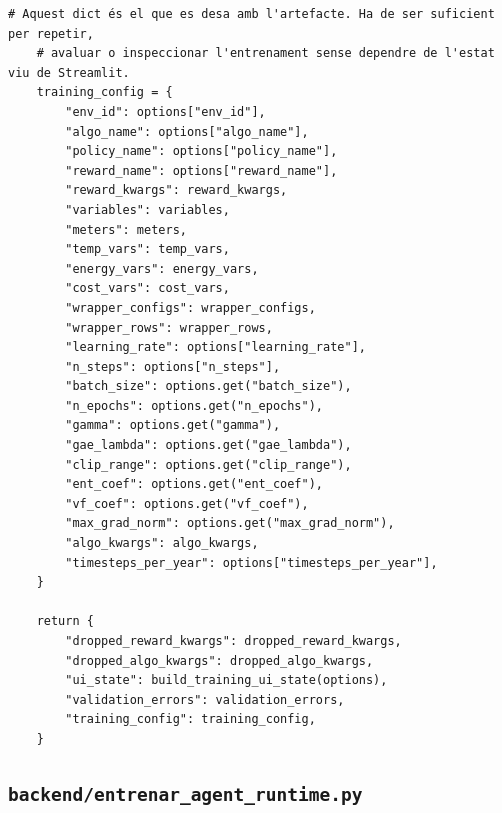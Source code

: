 \documentclass[10pt,a4paper]{article}
\begin{document}
\begin{lstlisting}[style=studioPython,caption={backend/entrenar\_agent\_rewards.py},label={lst:backend-entrenar-agent-rewards-py}]
    # Aquest dict és el que es desa amb l'artefacte. Ha de ser suficient per repetir,
    # avaluar o inspeccionar l'entrenament sense dependre de l'estat viu de Streamlit.
    training_config = {
        "env_id": options["env_id"],
        "algo_name": options["algo_name"],
        "policy_name": options["policy_name"],
        "reward_name": options["reward_name"],
        "reward_kwargs": reward_kwargs,
        "variables": variables,
        "meters": meters,
        "temp_vars": temp_vars,
        "energy_vars": energy_vars,
        "cost_vars": cost_vars,
        "wrapper_configs": wrapper_configs,
        "wrapper_rows": wrapper_rows,
        "learning_rate": options["learning_rate"],
        "n_steps": options["n_steps"],
        "batch_size": options.get("batch_size"),
        "n_epochs": options.get("n_epochs"),
        "gamma": options.get("gamma"),
        "gae_lambda": options.get("gae_lambda"),
        "clip_range": options.get("clip_range"),
        "ent_coef": options.get("ent_coef"),
        "vf_coef": options.get("vf_coef"),
        "max_grad_norm": options.get("max_grad_norm"),
        "algo_kwargs": algo_kwargs,
        "timesteps_per_year": options["timesteps_per_year"],
    }

    return {
        "dropped_reward_kwargs": dropped_reward_kwargs,
        "dropped_algo_kwargs": dropped_algo_kwargs,
        "ui_state": build_training_ui_state(options),
        "validation_errors": validation_errors,
        "training_config": training_config,
    }
\end{lstlisting}


\subsection{\texorpdfstring{\texttt{backend/entrenar\_agent\_runtime.py}}{backend/entrenar\_agent\_runtime.py}}
\end{document}
